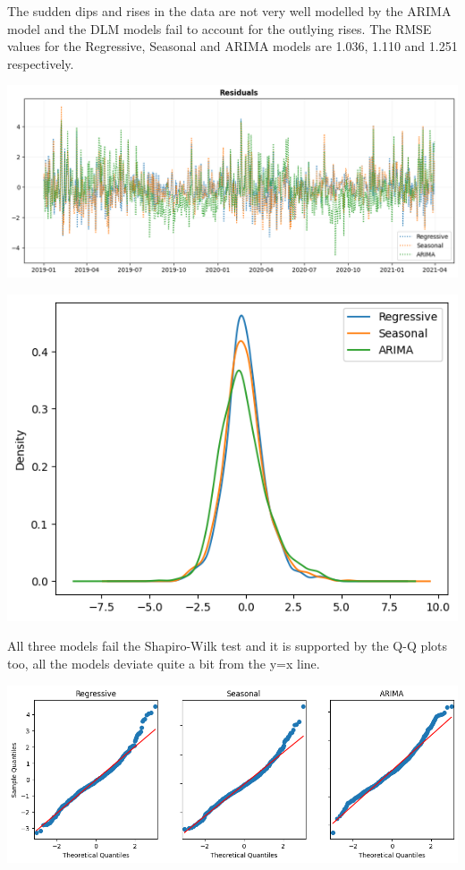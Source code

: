 \documentclass[a4paper,12pt]{article}
\begin{document}
The sudden dips and rises in the data are not very well modelled by the ARIMA model and the DLM models fail to account for the outlying rises. The RMSE values for the Regressive, Seasonal and ARIMA models are 1.036, 1.110 and 1.251 respectively.

\begin{center}
\includegraphics[width=1.00\textwidth]{./images/hamirpur/resid.png}
\end{center}

\begin{center}
\includegraphics[width=0.8\linewidth]{./images/hamirpur/dist.png}
\end{center}

All three models fail the Shapiro-Wilk test and it is supported by the Q-Q plots too, all the models deviate quite a bit from the y=x line.

\begin{center}
\includegraphics[width=0.8\linewidth]{./images/hamirpur/qq.png}
\end{center}
\end{document}
